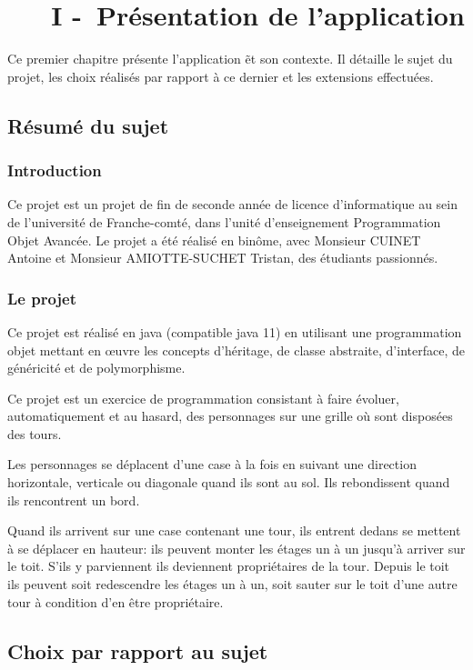 \chapter[~~~PRÉSENTATION]{~~~I -~Présentation de l'application}%
\label{refDev1}%

Ce premier chapitre présente l'application \nom\~et son contexte. Il détaille le sujet du projet, les choix réalisés par rapport à ce dernier et les extensions effectuées.

\section{Résumé du sujet}
\subsection{Introduction}

Ce projet est un projet de fin de seconde année de licence d'informatique au sein de l'université de Franche-comté, dans l'unité d'enseignement Programmation Objet Avancée.
Le projet a été réalisé en binôme, avec Monsieur CUINET Antoine et Monsieur AMIOTTE-SUCHET Tristan, des étudiants passionnés.

\subsection{Le projet}

Ce projet est réalisé en java (compatible java 11) en utilisant une programmation
objet mettant en œuvre les concepts d’héritage, de classe abstraite, d’interface, de généricité et de polymorphisme.
\bigskip

Ce projet est un exercice de programmation consistant à faire évoluer, automatiquement et au hasard, des personnages sur une grille où sont disposées des tours. 

Les personnages se déplacent d'une case à la fois en suivant une direction horizontale, verticale ou diagonale quand ils sont au sol. 
Ils rebondissent quand ils rencontrent un bord. 

Quand ils arrivent sur une case contenant une tour, ils entrent dedans se mettent à se déplacer en hauteur: ils peuvent monter les étages un à un jusqu'à arriver sur le toit. S'ils y parviennent ils deviennent propriétaires de la tour. 
Depuis le toit ils peuvent soit redescendre les étages un à un, soit sauter
sur le toit d'une autre tour à condition d'en être propriétaire.

\section{Choix par rapport au sujet}

